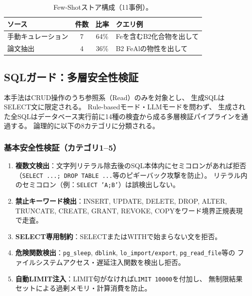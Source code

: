 \documentclass[5p,twocolumn]{elsarticle}
\begin{document}
\begin{table}[htbp]
  \centering
  \caption{Few-Shotストア構成（11事例）。}
  \label{tab:few_shot_sources}
  \scriptsize
  \begin{tabular}{lccp{3.5cm}}
    \toprule
    ソース & 件数 & 比率 & クエリ例 \\
    \midrule
    手動キュレーション & 7 & 64\% & Feを含むB2化合物を出して \\
    論文抽出 & 4 & 36\% & B2 FeAlの物性を出して \\
    \bottomrule
  \end{tabular}
\end{table}

\subsection{SQLガード：多層安全性検証}
\label{sec:sql_guard}

本手法はCRUD操作のうち参照系（Read）のみを対象とし、
生成SQLはSELECT文に限定される。
Rule-basedモード・LLMモードを問わず、
生成された全SQLはデータベース実行前に14種の検査から成る多層検証パイプラインを通過する。
論理的に以下の8カテゴリに分類される。

\subsubsection{基本安全性検証（カテゴリ1--5）}

\begin{enumerate}
  \item \textbf{複数文検出}：文字列リテラル除去後のSQL本体内にセミコロンがあれば拒否
    （\texttt{SELECT ...; DROP TABLE ...}等のピギーバック攻撃を防止）。
    リテラル内のセミコロン（例：\texttt{SELECT 'A;B'}）は誤検出しない。
  \item \textbf{禁止キーワード検出}：INSERT, UPDATE, DELETE, DROP, ALTER,
    TRUNCATE, CREATE, GRANT, REVOKE, COPYをワード境界正規表現で走査。
  \item \textbf{SELECT専用制約}：SELECTまたはWITHで始まらない文を拒否。
  \item \textbf{危険関数検出}：\texttt{pg\_sleep}, \texttt{dblink},
    \texttt{lo\_import/export}, \texttt{pg\_read\_file}等の
    ファイルシステムアクセス・遅延注入関数を検出し拒否。
  \item \textbf{自動LIMIT注入}：LIMIT句がなければ\texttt{LIMIT 10000}を付加し、
    無制限結果セットによる過剰メモリ・計算消費を防止。
\end{enumerate}
\end{document}
